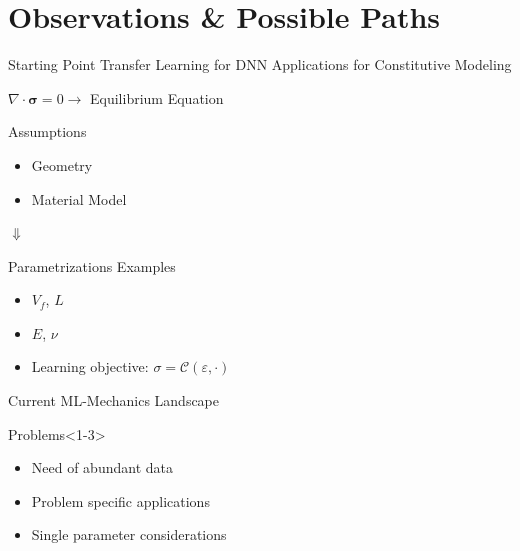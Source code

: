 \section{Observations \& Possible Paths}

\begin{frame}{Starting Point}
  \centering
    \color{Pink} Transfer Learning for DNN Applications for Constitutive Modeling \color{Black}
\begin{center}
  $\nabla \cdot \boldsymbol{\sigma} =0 \to  $ Equilibrium Equation 
\end{center}
 
\begin{minipage}{0.45\textwidth}
  \begin{block}{\color{White} Assumptions}
   \begin{itemize}
      \item Geometry 
      \item Material Model
   \end{itemize}
  \end{block} 
   {
  \centering
    $\Downarrow$
  \begin{block}{\color{White} Parametrizations Examples}
   \begin{itemize}
      \item $V_f$, $L$
      \item $E$, $\nu$
   \end{itemize}
  \end{block}}
\end{minipage}%
\hspace{1cm}
\begin{minipage}{0.45\textwidth}
  \centering
  \begin{itemize}
      \item Learning objective: $\sigma=\mathcal{C}(\varepsilon, \cdot)$ 
  \end{itemize}
\end{minipage}
\end{frame}

\begin{frame}{Current ML-Mechanics Landscape}
\begin{minipage}{0.45\textwidth}
  \begin{block}{\color{White} Problems}<1-3>
    \begin{itemize}
      \item <3> Need of abundant data
      \item <3> Problem specific applications 
      \item <3> Single parameter considerations
    \end{itemize}
  \end{block} 
\end{minipage}%
\begin{minipage}{0.45\textwidth}
    \centering
    \color{Pink}  
  \end{minipage}
\end{frame}

